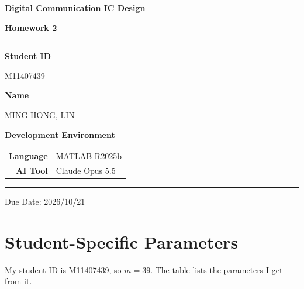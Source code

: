 \documentclass[12pt,a4paper]{report}
\begin{document}
\pagestyle{plain}

\begin{titlepage}
\centering
\vspace*{3cm}

{\fontsize{28}{34}\selectfont\bfseries Digital Communication IC Design\par}
\vspace{0.6em}
{\fontsize{20}{26}\selectfont\bfseries Homework 2\par}

\vspace{1.5cm}
\textcolor{crimson}{\rule{0.6\linewidth}{1.2pt}}
\vspace{1.5cm}

{\large\bfseries Student ID}\par
\vspace{0.4em}
{\large M11407439}\par

\vspace{0.8em}

{\large\bfseries Name}\par
\vspace{0.4em}
{\large MING-HONG, LIN}\par

\vspace{2cm}

{\large\bfseries Development Environment}\par
\vspace{0.8em}
\begin{tabular}{rl}
    \textbf{Language} & MATLAB R2025b \\[4pt]
    \textbf{AI Tool}  & Claude Opus 5.5 \\
\end{tabular}

\vfill

\textcolor{crimson}{\rule{0.6\linewidth}{0.6pt}}\par
\vspace{0.5em}
{\small Due Date: 2026/10/21}

\end{titlepage}

\tableofcontents
\newpage

\chapter{Student-Specific Parameters}
My student ID is M11407439, so $m = 39$. The table lists the parameters I get from it.
\end{document}
